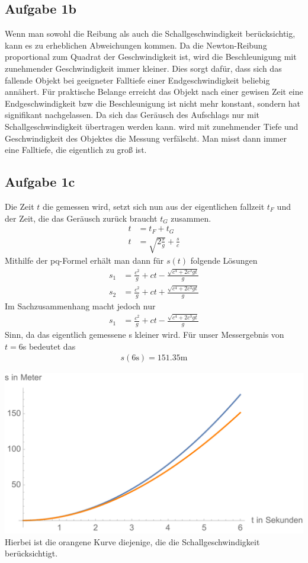 \documentclass[a4paper,10pt]{extarticle}
\begin{document}
\subsection*{Aufgabe 1b}
Wenn man sowohl die Reibung als auch die Schallgeschwindigkeit berücksichtig, kann es zu erheblichen Abweichungen kommen. Da die Newton-Reibung proportional zum Quadrat der Geschwindigkeit ist, wird die Beschleunigung mit zunehmender Geschwindigkeit immer kleiner. Dies sorgt dafür, dass sich das fallende Objekt bei geeigneter Falltiefe einer Endgeschwindigkeit beliebig annähert. Für praktische Belange erreicht das Objekt nach einer gewisen Zeit eine Endgeschwindigkeit bzw die Beschleunigung ist nicht mehr konstant, sondern hat signifikant nachgelassen. Da sich das Geräusch des Aufschlags nur mit Schallgeschwindigkeit übertragen werden kann. wird mit zunehmender Tiefe und Geschwindigkeit des Objektes die Messung verfälscht. Man misst dann immer eine Falltiefe, die eigentlich zu groß ist. 

\subsection*{Aufgabe 1c}
Die Zeit $t$ die gemessen wird, setzt sich nun aus der eigentlichen fallzeit $t_F$ und der Zeit, die das Geräusch zurück braucht $t_G$ zusammen.
\begin{align*}
  t &= t_F + t_G\\
  t &= \sqrt{2\frac{s}{g}} + \frac{s}{c} 
\end{align*}
Mithilfe der pq-Formel erhält man dann für $s(t)$ folgende Lösungen
\begin{align*}
  s_1 &= \frac{c^2}{g} + ct - \frac{\sqrt{c^4+2c^3gt}}{g}\\
  s_2 &= \frac{c^2}{g} + ct + \frac{\sqrt{c^4+2c^3gt}}{g}
\end{align*}
Im Sachzusammenhang macht jedoch nur 
\begin{align*}
  s_1 &= \frac{c^2}{g} + ct - \frac{\sqrt{c^4+2c^3gt}}{g}
\end{align*}
Sinn, da das eigentlich gemessene s kleiner wird. 
Für unser Messergebnis von $t = 6$s bedeutet das
\begin{align*}
  s(6\mbox{s}) = 151.35\mbox{m}
\end{align*}

\includegraphics[scale=0.5]{./Abbildungen/Abbildung_03.pdf}
Hierbei ist die orangene Kurve diejenige, die die Schallgeschwindigkeit berücksichtigt.
\end{document}
